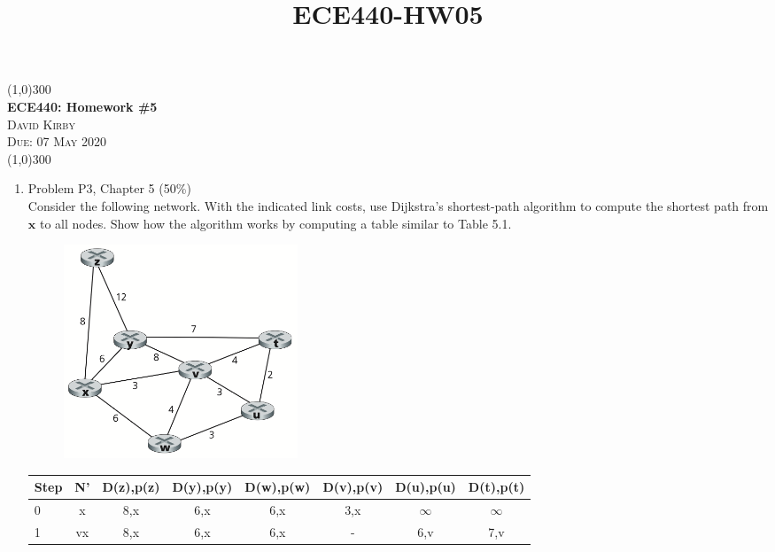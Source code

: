 \documentclass[12pt]{article}
\title{ECE440-HW05}
\begin{document}
 	\begin{center}
     \line(1,0){300}\\[0.25cm]
 	\Large{\bfseries ECE440: Homework \#5}\\
 	\textsc{\large David Kirby}\\
 	\textsc{\large Due: 07 May 2020}\\
 	\line(1,0){300}\\[0.75cm]
 	\end{center}
 
\begin{enumerate}
\bfseries \item Problem P3, Chapter 5 (50\%)\\[1em]
Consider the following network. With the indicated link costs, use Dijkstra’s shortest-path algorithm to compute the shortest path from $\bm{x}$ to all nodes. Show how the algorithm works by computing a table similar to Table 5.1.\par
\begin{figure}[h!]
    \centering
    \includegraphics[width=0.35\textwidth]{Screen Shot 2020-05-04 at 23.25.42.png}
\end{figure}
\begin{table}[ht]
\centering
\begin{tabular}{@{}lccccccc@{}}
\arrayrulecolor{RoyalBlue}\toprule
Step & N'      & D(z),p(z)                  & D(y),p(y)                  & D(w),p(w)                  & D(v),p(v)                  & D(u),p(u)                  & D(t),p(t)                  \\ \midrule
0    & x       & 8,x                        & 6,x                        & 6,x                        & {\color[HTML]{FE0000} 3,x} & $\infty$                      & $\infty$                      \\
1    & vx      & 8,x                        & 6,x                        & {\color[HTML]{FE0000} 6,x} & -                          & 6,v                        & 7,v                        \\

\end{tabular}
\end{table}
\end{enumerate}
\end{document}
